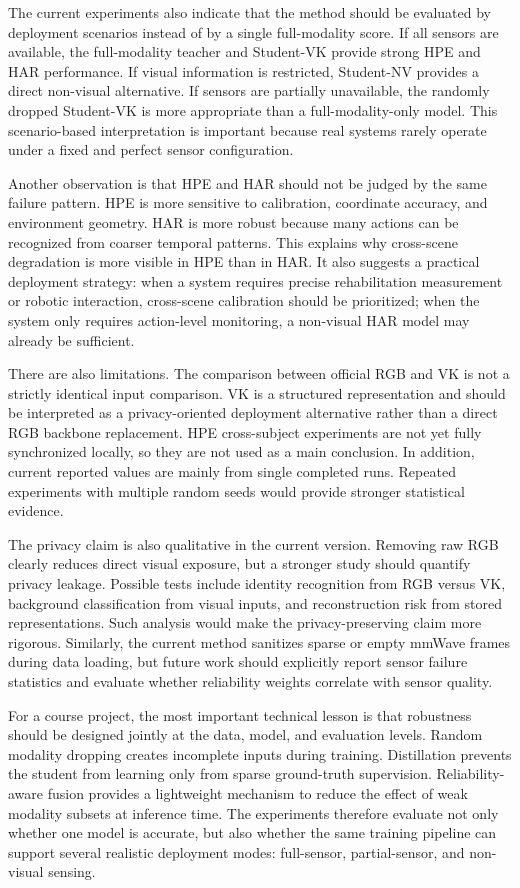 \documentclass[journal, twocolumn, transmag]{IEEEtran}
\begin{document}
The current experiments also indicate that the method should be evaluated by deployment scenarios instead of by a single full-modality score. If all sensors are available, the full-modality teacher and Student-VK provide strong HPE and HAR performance. If visual information is restricted, Student-NV provides a direct non-visual alternative. If sensors are partially unavailable, the randomly dropped Student-VK is more appropriate than a full-modality-only model. This scenario-based interpretation is important because real systems rarely operate under a fixed and perfect sensor configuration.

Another observation is that HPE and HAR should not be judged by the same failure pattern. HPE is more sensitive to calibration, coordinate accuracy, and environment geometry. HAR is more robust because many actions can be recognized from coarser temporal patterns. This explains why cross-scene degradation is more visible in HPE than in HAR. It also suggests a practical deployment strategy: when a system requires precise rehabilitation measurement or robotic interaction, cross-scene calibration should be prioritized; when the system only requires action-level monitoring, a non-visual HAR model may already be sufficient.

There are also limitations. The comparison between official RGB and VK is not a strictly identical input comparison. VK is a structured representation and should be interpreted as a privacy-oriented deployment alternative rather than a direct RGB backbone replacement. HPE cross-subject experiments are not yet fully synchronized locally, so they are not used as a main conclusion. In addition, current reported values are mainly from single completed runs. Repeated experiments with multiple random seeds would provide stronger statistical evidence.

The privacy claim is also qualitative in the current version. Removing raw RGB clearly reduces direct visual exposure, but a stronger study should quantify privacy leakage. Possible tests include identity recognition from RGB versus VK, background classification from visual inputs, and reconstruction risk from stored representations. Such analysis would make the privacy-preserving claim more rigorous. Similarly, the current method sanitizes sparse or empty mmWave frames during data loading, but future work should explicitly report sensor failure statistics and evaluate whether reliability weights correlate with sensor quality.

For a course project, the most important technical lesson is that robustness should be designed jointly at the data, model, and evaluation levels. Random modality dropping creates incomplete inputs during training. Distillation prevents the student from learning only from sparse ground-truth supervision. Reliability-aware fusion provides a lightweight mechanism to reduce the effect of weak modality subsets at inference time. The experiments therefore evaluate not only whether one model is accurate, but also whether the same training pipeline can support several realistic deployment modes: full-sensor, partial-sensor, and non-visual sensing.
\end{document}
